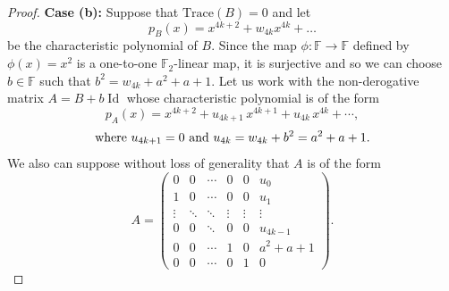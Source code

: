 \documentclass{amsart}
\DeclareMathOperator{\Id}{Id}
\def\FF{\mathbb{F}}
\theoremstyle{definition}
\theoremstyle{remark}
\numberwithin{equation}{section}
\begin{document}
\begin{proof}
{\bf Case (b):} Suppose that $\text{Trace}(B)= 0$ and let $$p_B(x)=x^{4k+2}+w_{4k}x^{4k}+\dots$$ be the characteristic polynomial of $B$. Since the map $\phi: \FF\to \FF$ defined by $\phi(x)=x^2$ is a one-to-one $\mathbb{F}_2$-linear map, it is surjective and so we can choose $b\in \FF$ such that $b^2 =w_{4k}+a^2+a+1$. Let us work with the non-derogative matrix $A=B+b\Id$ whose characteristic polynomial is of the form $$p_{A}(x)=x^{4k+2}+ u_{4k+1} \, x^{4k+1}+u_{4k}\, x^{4k}+\cdots ,$$
$$\hbox{where} ~ u_{4k+1}=0 ~ \hbox{and} ~ u_{4k}=w_{4k}+b^2=a^2+a+1.$$
We also can suppose without loss of generality that $A$ is of the form
 $$A=\left(\begin{array}{cccccc}
                                                                          0 & 0 & \cdots & 0 & 0 &u_0\\
                                                                          1 & 0 & \cdots & 0 & 0 &u_1\\
                                                                          \vdots & \ddots & \ddots & \vdots & \vdots &\vdots\\
                                                                          0 & 0 & \ddots & 0 & 0 &u_{4k-1}\\
                                                                          0 & 0 & \cdots & 1 & 0 &a^2+a+1\\
                                                                          0 & 0 & \cdots & 0 & 1 &0
                                                                        \end{array}\right).$$


\end{proof}
\end{document}
